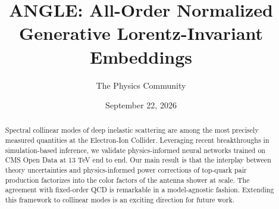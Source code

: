 \documentclass[11pt]{article}
\title{ANGLE: All-Order Normalized Generative Lorentz-Invariant Embeddings}
\author{The Physics Community}
\date{September 22, 2026}
\numberwithin{equation}{section}
\theoremstyle{definition}
\theoremstyle{remark}
\begin{document}
\maketitle
\begin{abstract}
Spectral collinear modes of deep inelastic scattering are among the most
precisely measured quantities at the Electron-Ion Collider. Leveraging
recent breakthroughs in simulation-based inference, we validate
physics-informed neural networks trained on CMS Open Data at 13 TeV end
to end. Our main result is that the interplay between theory
uncertainties and physics-informed power corrections of top-quark pair
production factorizes into the color factors of the antenna shower at
scale. The agreement with fixed-order QCD is remarkable in a
model-agnostic fashion. Extending this framework to collinear modes is
an exciting direction for future work.
\end{abstract}
\tableofcontents




\nocite{*}


\end{document}
